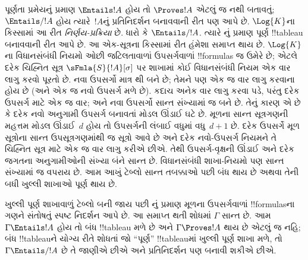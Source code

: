 \documentclass[../../../include/open-logic-section]{subfiles}
\begin{document}
      

\begin{explain}
  પૂર્ણતા પ્રમેયનું પ્રમાણ $\Entails !A$ હોય તો $\Proves !A$
  એટલું જ નથી બતાવતું; $\Entails/ !A$ હોય ત્યારે~$!A$નું
  પ્રતિનિદર્શન બનાવવાની રીત પણ આપે છે.
  $\Log{K}$ના કિસ્સામાં આ રીત \emph{નિર્ણય-પ્રક્રિયા} છે.
  ધારો કે $\Entails/ !A$. ત્યારે
  નું પ્રમાણ પૂર્ણ
  !!{tableau} બનાવવાની રીત આપે છે. આ એક-સૂત્રના કિસ્સામાં
  રીત હંમેશા સમાપ્ત થાય છે. $\Log{K}$ના વિધાનસંબંધી નિયમો
  ઓછી જટિલતાવાળાં ઉપસર્ગવાળાં !!{formula}s જ ઉમેરે છે;
  એટલે દરેક ચિહ્નિત સૂત્ર $\sFmla{S}{!A}[\sigma]$ પર
  શાખામાં કોઈ વિધાનસંબંધી નિયમ એક વાર લાગુ કરવો પૂરતો છે.
  નવા ઉપસર્ગો માત્ર
  થી બને છે; તેમને
  પણ એક જ વાર લાગુ કરવાના હોય છે (અને એક જ નવો ઉપસર્ગ મળે છે).
   કદાચ અનેક વાર
  લાગુ કરવા પડે, પરંતુ દરેક ઉપસર્ગ માટે એક જ વાર; અને નવા
  ઉપસર્ગો સાન્ત સંખ્યામાં જ બને છે. તેનું કારણ એ છે કે
  દરેક નવો અનુગામી ઉપસર્ગ બનાવતાં મોડલ ઊંડાઈ ઘટે છે.
  મૂળના સાન્ત સૂત્રગણની મહત્તમ મોડલ ઊંડાઈ~$d$ હોય તો
  ઉપસર્ગની લંબાઈ વધુમાં વધુ~$d+1$ છે. દરેક ઉપસર્ગે મૂળ
  સૂત્રોના સાન્ત ઉપસૂત્રગણમાંથી જ સૂત્રો આવે છે અને દરેક
  નવો-ઉપસર્ગ નિયમને તે ચિહ્નિત સૂત્ર માટે એક જ વાર લાગુ કરીએ
  છીએ. તેથી ઉપસર્ગ-વૃક્ષની ઊંડાઈ અને દરેક જગતના અનુગામીઓની
  સંખ્યા બંને સાન્ત છે. વિધાનસંબંધી શાખા-નિયમો પણ સાન્ત
  સંખ્યામાં જ વપરાય છે. આમ આખું ટેબ્લો સાન્ત તબક્કાઓ પછી
  બંધ થાય છે અથવા તેની બધી ખુલ્લી શાખાઓ પૂર્ણ થાય છે.

  ખુલ્લી પૂર્ણ શાખાવાળું ટેબ્લો બની જાય પછી
  નું પ્રમાણ મૂળના
  ઉપસર્ગવાળાં !!{formula}sના ગણને સંતોષતું સ્પષ્ટ નિદર્શન
  આપે છે. આ સમાપ્ત થતી શોધમાં $\Gamma$ સાન્ત છે.
  આમ $\Gamma \Entails !A$ હોય તો બંધ !!{tableau}
  મળે છે અને $\Gamma \Proves !A$ થાય છે એટલું જ નહિ;
  બંધ !!{tableau}ને યોગ્ય રીતે શોધતાં જો ``પૂર્ણ''
  !!{tableau}માં ખુલ્લી પૂર્ણ શાખા મળે, તો $\Gamma \Entails/ !A$ છે તે જાણીએ
  છીએ અને પ્રતિનિદર્શન પણ બનાવી શકીએ છીએ.
\end{explain}
\end{document}
